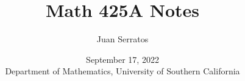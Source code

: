 \documentclass[oneside]{amsart}
\theoremstyle{definition}
\newtheorem{defi}{Definition}[section]
\newcommand{\nn}{\mathbb N}
\newcommand{\qq}{\mathbb Q}
\DeclareMathOperator{\card}{card}
\begin{document}
\title{Math 425A Notes}
\author{Juan Serratos}
\date{ September 17, 2022 \\ {Department of Mathematics, University of Southern California}}
\address{Department of Mathematics, University of Southern California, 
Los Angeles, CA 90007}
\maketitle
\setcounter{tocdepth}{4}
\setcounter{secnumdepth}{4}
\tableofcontents

\end{document}
